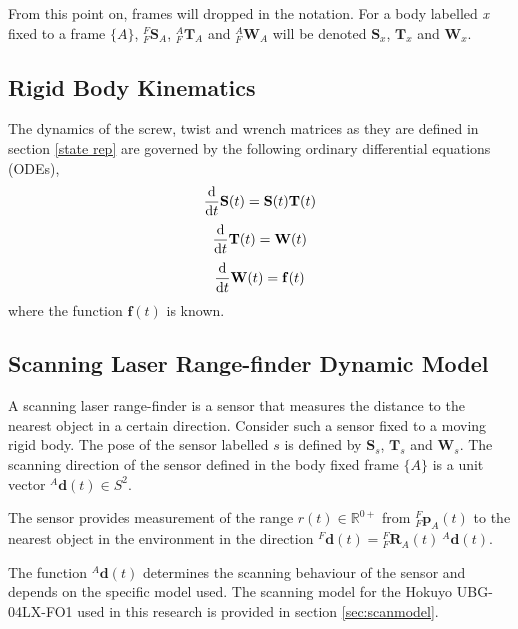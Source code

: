 		From this point on, frames will dropped in the notation. For a body labelled \textit{x} fixed to a frame $\{A\}$, ${^{F}_{F}\mathbf{S}^{}_{A}}$, ${^{A}_{F}\mathbf{T}^{}_{A}}$ and ${^{A}_{F}\mathbf{W}^{}_{A}}$ will be denoted $\mathbf{S}_x$, $\mathbf{T}_x$ and $\mathbf{W}_x$.
						
	\subsection{Rigid Body Kinematics} \label{kinematics}
		The dynamics of the screw, twist and wrench matrices as they are defined in section \ref{state rep} are governed by the following ordinary differential equations (ODEs),
		\begin{equation}
			{\frac{\textnormal{d}}{\textnormal{d}t}} \mathbf{S}(t) =\mathbf{S}(t)\mathbf{T}(t)
		\end{equation}		
		\begin{equation}
			{\frac{\textnormal{d}}{\textnormal{d}t}} \mathbf{T}(t) = \mathbf{W}(t)
		\end{equation}		
		\begin{equation}
			{\frac{\textnormal{d}}{\textnormal{d}t}} \mathbf{W}(t)=\mathbf{f}(t)			
		\end{equation}
		where the function $\mathbf{f}(t)$ is known.
	
	\subsection{Scanning Laser Range-finder Dynamic Model}
		A scanning laser range-finder is a sensor that measures the distance to the nearest object in a certain direction. Consider such a sensor fixed to a moving rigid body. The pose of the sensor labelled $s$ is defined by $\mathbf{S}_s$, $\mathbf{T}_s$ and $\mathbf{W}_s$. The scanning direction of the sensor defined in the body fixed frame $\{A\}$ is a unit vector ${^{A}\mathbf{d}(t)} \in S^2$.	
		
		The sensor provides measurement of the range $r(t) \in \mathbb{R}^{0+}$ from $^{F}_{F}\mathbf{p}^{}_{A}(t)$ to the nearest object in the environment in the direction ${^{F}\mathbf{d}(t)} = {^{F}_{F}\mathbf{R}^{}_{A}(t)}\:{^{A}\mathbf{d}(t)}$.
		
		The function ${^{A}\mathbf{d}(t)}$ determines the scanning behaviour of the sensor and depends on the specific model used. The scanning model for the Hokuyo UBG-04LX-FO1 used in this research is provided in section \ref{sec:scanmodel}.
		
